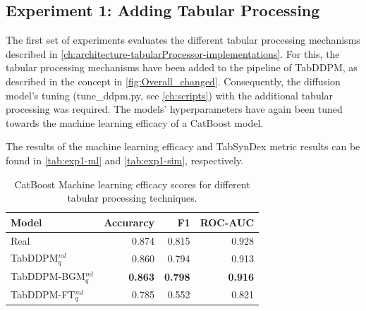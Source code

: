 \subsection{Experiment 1: Adding Tabular Processing}
\label{ch:Experiment-1}

The first set of experiments evaluates the different tabular processing mechanisms described in \autoref{ch:architecture-tabularProcessor-implementations}.
For this, the tabular processing mechanisms have been added to the pipeline of TabDDPM, as described in the concept in \autoref{fig:Overall_changed}.
Consequently, the diffusion model's tuning (tune\_ddpm.py, see \autoref{ch:scripts}) with the additional tabular processing was required.
The models' hyperparameters have again been tuned towards the machine learning efficacy of a CatBoost model.

The results of the machine learning efficacy and TabSynDex metric results can be found in \autoref{tab:exp1-ml} and \autoref{tab:exp1-sim}, respectively.
\begin{table}[h]
	\centering
	\begin{tabular}{lrrr}
		\toprule
		\textbf{Model}         & \textbf{Accurarcy} & \textbf{F1}    & \textbf{ROC-AUC} \\
		\midrule
		Real                   & 0.874              & 0.815          & 0.928            \\
		TabDDPM$^{ml}_{q}$     & 0.860              & 0.794          & 0.913            \\
		TabDDPM-BGM$^{ml}_{q}$ & \textbf{0.863}     & \textbf{0.798} & \textbf{0.916}   \\
		TabDDPM-FT$^{ml}_{q}$  & 0.785              & 0.552          & 0.821            \\
		\bottomrule
	\end{tabular}
	\caption[Experiment 1 ML-Efficacy]{CatBoost Machine learning efficacy scores for different tabular processing techniques.}
	\label{tab:exp1-ml}
\end{table}

